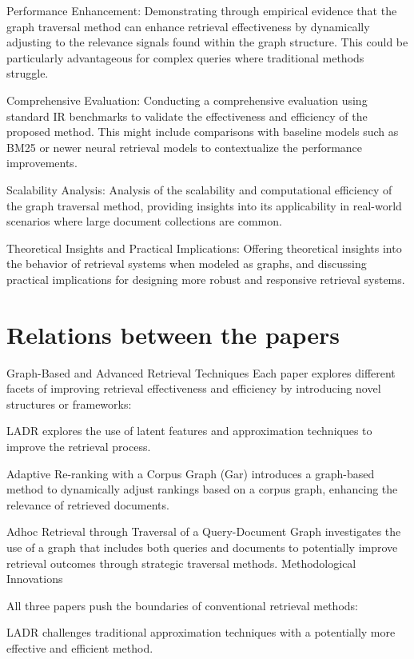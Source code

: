 \documentclass[sigconf,authorversion,nonacm]{acmart}
\begin{document}
Performance Enhancement: Demonstrating through empirical evidence that the graph traversal method
can enhance retrieval effectiveness by dynamically adjusting to the relevance signals found within
the graph structure. This could be particularly advantageous for complex queries where traditional
methods struggle.

Comprehensive Evaluation: Conducting a comprehensive evaluation using standard IR benchmarks to
validate the effectiveness and efficiency of the proposed method. This might include comparisons
with baseline models such as BM25 or newer neural retrieval models to contextualize the performance
improvements.

Scalability Analysis: Analysis of the scalability and computational efficiency of the graph
traversal method, providing insights into its applicability in real-world scenarios where large
document collections are common.

Theoretical Insights and Practical Implications: Offering theoretical insights into the behavior of
retrieval systems when modeled as graphs, and discussing practical implications for designing more
robust and responsive retrieval systems.

\section{Relations between the papers}


Graph-Based and Advanced Retrieval Techniques Each paper explores different
facets of improving retrieval effectiveness and efficiency by introducing novel structures
or frameworks:

LADR explores the use of latent features and approximation techniques to improve the
retrieval process.

Adaptive Re-ranking with a Corpus Graph (Gar) introduces a graph-based method to dynamically
adjust rankings based on a corpus graph, enhancing the relevance of retrieved documents.

Adhoc Retrieval through Traversal of a Query-Document Graph investigates the use of a graph
that includes both queries and documents to potentially improve retrieval outcomes through
strategic traversal methods. Methodological Innovations

All three papers push the boundaries of conventional retrieval methods:

LADR challenges traditional approximation techniques with a potentially more effective and
efficient method.
\end{document}

